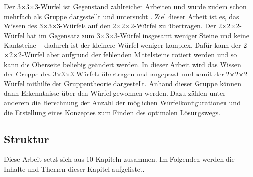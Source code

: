 \documentclass[12pt,a4paper, usenames, dvipsnames]{article}
\theoremstyle{mystyle}
\theoremstyle{definition}
\newcommand{\Ttwo}{2$\times$2$\times$2-}
\newcommand{\Tthree}{3$\times$3$\times$3-}
\begin{document}
Der \Tthree Würfel ist Gegenstand zahlreicher Arbeiten und
wurde zudem schon mehrfach als Gruppe dargestellt und untersucht  \cite{JC,TD,DDJT,DJ,RMG,TR}. Ziel dieser Arbeit ist es, das Wissen des \Tthree Würfels auf den \Ttwo Würfel zu übertragen. Der \Ttwo Würfel hat im Gegensatz zum \Tthree Würfel insgesamt weniger Steine und keine Kantsteine -- dadurch ist der kleinere Würfel weniger komplex. Dafür kann der \Ttwo Würfel aber aufgrund der fehlenden Mittelsteine rotiert werden und so kann die Oberseite beliebig geändert werden. In dieser Arbeit wird das Wissen der Gruppe des \Tthree Würfels übertragen und angepasst und somit der \Ttwo Würfel mithilfe der Gruppentheorie dargestellt. Anhand dieser Gruppe können dann Erkenntnisse über den Würfel gewonnen werden. Dazu zählen unter anderem die Berechnung der Anzahl der möglichen Würfelkonfigurationen und die Erstellung eines Konzeptes zum Finden des optimalen Lösungswegs.


%
%
%
%
%
%
%
%
\subsection{Struktur} 

Diese Arbeit setzt sich aus 10 Kapiteln zusammen. Im Folgenden werden die Inhalte und Themen dieser Kapitel aufgelistet.
\end{document}
